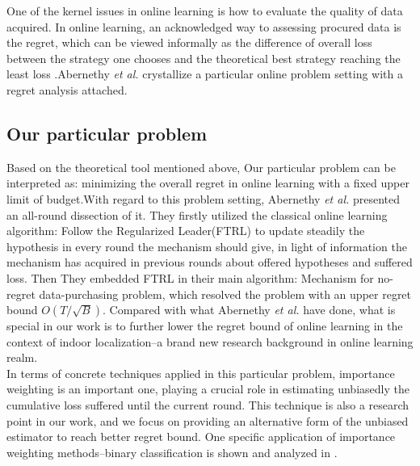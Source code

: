 \documentclass[10pt,conference,compsocconf,letterpaper]{IEEEtran}
\begin{document}
One of the kernel issues in online learning is how to evaluate the quality of data acquired. In online learning, an acknowledged way to assessing procured data is the regret, which can be viewed informally as the difference of overall loss between the strategy one chooses and the theoretical best strategy reaching the least loss \cite{shalev2011online}.Abernethy \emph{et al.} crystallize a particular online problem setting with a regret analysis attached\cite{abernethy2015low}.

\subsection{Our particular problem}

Based on the theoretical tool mentioned above, Our particular problem can be interpreted as: minimizing the overall regret in online learning with a fixed upper limit of budget.With regard to this problem setting, Abernethy \emph{et al.} presented an all-round dissection of it\cite{abernethy2015low}. They firstly utilized the classical online learning algorithm: Follow the Regularized Leader(FTRL) to update steadily the hypothesis in every round the mechanism should give, in light of information the mechanism has acquired in previous rounds about offered hypotheses and suffered loss. Then They embedded FTRL in their main algorithm: Mechanism for no-regret data-purchasing problem, which resolved the problem with an upper regret bound $O(T/\sqrt{B})$. Compared with what Abernethy \emph{et al.} have done\cite{abernethy2015low}, what is special in our work is to further lower the regret bound of online learning in the context of indoor localization--a brand new research background in online learning realm.\\
\indent In terms of concrete techniques applied in this particular problem, importance weighting is an important one, playing a crucial role in estimating unbiasedly the cumulative loss suffered until the current round\cite{abernethy2015low}. This technique is also a research point in our work, and we focus on providing an alternative form of the unbiased estimator to reach better regret bound. One specific application of importance weighting methods--binary classification is shown and analyzed in \cite{beygelzimer2009importance}.\\
\end{document}
